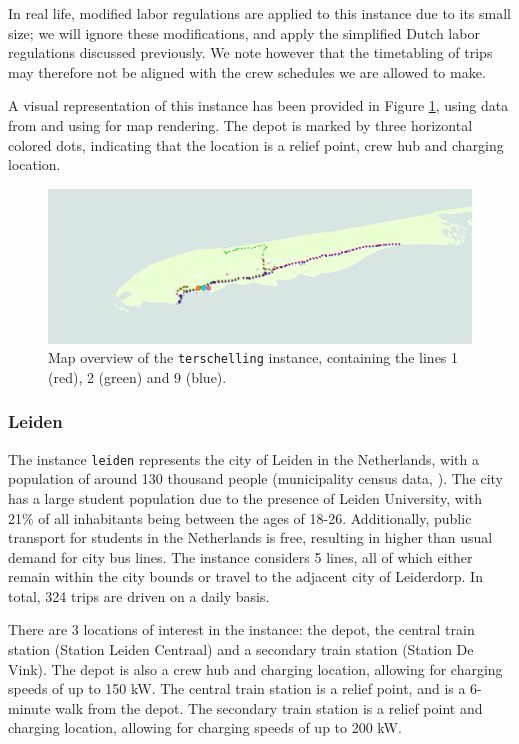 \documentclass[]{article}
\begin{document}
In real life, modified labor regulations are applied to this instance due to its small size; we will ignore these modifications, and apply the simplified Dutch labor regulations discussed previously. We note however that the timetabling of trips may therefore not be aligned with the crew schedules we are allowed to make.

A visual representation of this instance has been provided in Figure \ref{fig:terschelling-map}, using data from \citet{OpenStreetMap2025} and using \citet{QGIS2025} for map rendering. The depot is marked by three horizontal colored dots, indicating that the location is a relief point, crew hub and charging location. 

\begin{figure}[h]
  \centering
  \includegraphics[width=\textwidth]{images/terschelling-instance.png}
  \caption{Map overview of the \texttt{terschelling} instance, containing the lines 1 (red), 2 (green) and 9 (blue).}
  \label{fig:terschelling-map}
\end{figure}

\subsubsection{Leiden}
The instance \texttt{leiden} represents the city of Leiden in the Netherlands, with a population of around 130 thousand people (municipality census data, \citet{Leiden2025}). The city has a large student population due to the presence of Leiden University, with 21\% of all inhabitants being between the ages of 18-26. Additionally, public transport for students in the Netherlands is free, resulting in higher than usual demand for city bus lines. The instance considers 5 lines, all of which either remain within the city bounds or travel to the adjacent city of Leiderdorp. In total, 324 trips are driven on a daily basis. 

There are 3 locations of interest in the instance: the depot, the central train station (Station Leiden Centraal) and a secondary train station (Station De Vink). The depot is also a crew hub and charging location, allowing for charging speeds of up to 150 kW. The central train station is a relief point, and is a 6-minute walk from the depot. The secondary train station is a relief point and charging location, allowing for charging speeds of up to 200 kW.
\end{document}
